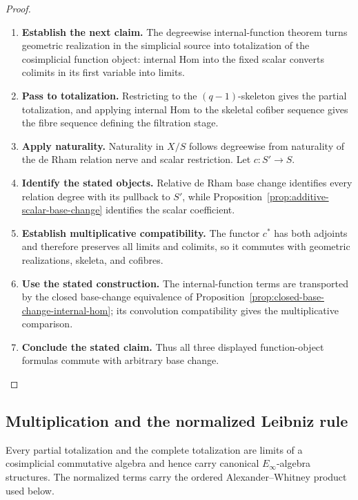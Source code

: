 \begin{proof}
\leavevmode
\begin{enumerate}[label=\textup{(\arabic*)}]
    \item \textbf{Establish the next claim.}
    The degreewise internal-function theorem turns geometric realization in the
    simplicial source into totalization of the cosimplicial function object: internal
    Hom into the fixed scalar converts colimits in its first variable into limits.
    \item \textbf{Pass to totalization.}
    Restricting to the \((q-1)\)-skeleton gives the partial totalization, and applying
    internal Hom to the skeletal cofiber sequence gives the fibre sequence defining the
    filtration stage.
    \item \textbf{Apply naturality.}
    Naturality in \(X/S\) follows degreewise from naturality of the de Rham
    relation nerve and scalar restriction.
    Let \(c:S'\to S\).
    \item \textbf{Identify the stated objects.}
    Relative de Rham
    base change identifies every relation degree with its pullback to \(S'\),
    while Proposition~\ref{prop:additive-scalar-base-change} identifies the scalar
    coefficient.
    \item \textbf{Establish multiplicative compatibility.}
    The functor \(c^*\) has both adjoints and therefore preserves all
    limits and colimits, so it commutes with geometric realizations, skeleta, and
    cofibres.
    \item \textbf{Use the stated construction.}
    The internal-function terms are transported by the closed
    base-change equivalence of
    Proposition~\ref{prop:closed-base-change-internal-hom}; its convolution
    compatibility gives the multiplicative comparison.
    \item \textbf{Conclude the stated claim.}
    Thus all three displayed function-object formulas commute with arbitrary base
    change.
\end{enumerate}
\end{proof}

\subsection{Multiplication and the normalized Leibniz rule}
\label{sec:de-Rham-multiplication}

Every partial totalization and the complete totalization are limits of a cosimplicial
commutative algebra and hence carry canonical \(E_\infty\)-algebra structures.
The normalized terms carry the ordered Alexander--Whitney product used below.

